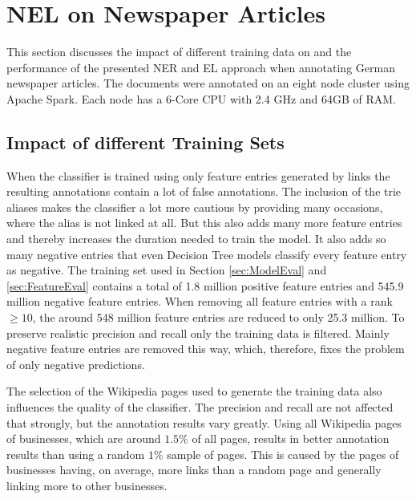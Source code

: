 \section{NEL on Newspaper Articles}
\label{sec:NELEval}
This section discusses the impact of different training data on and the performance of the presented NER and EL approach when annotating German newspaper articles. The documents were annotated on an eight node cluster using Apache Spark. Each node has a 6-Core CPU with 2.4 GHz and 64GB of RAM.\par

\subsection*{Impact of different Training Sets}
When the classifier is trained using only feature entries generated by links the resulting annotations contain a lot of false annotations. The inclusion of the trie aliases makes the classifier a lot more cautious by providing many occasions, where the alias is not linked at all. But this also adds many more feature entries and thereby increases the duration needed to train the model. It also adds so many negative entries that even Decision Tree models classify every feature entry as negative. The training set used in Section \ref{sec:ModelEval} and \ref{sec:FeatureEval} contains a total of 1.8 million positive feature entries and 545.9 million negative feature entries. When removing all feature entries with a rank $\geq 10$, the around 548 million feature entries are reduced to only 25.3 million. To preserve realistic precision and recall only the training data is filtered. Mainly negative feature entries are removed this way, which, therefore, fixes the problem of only negative predictions.\par
The selection of the Wikipedia pages used to generate the training data also influences the quality of the classifier. The precision and recall are not affected that strongly, but the annotation results vary greatly. Using all Wikipedia pages of businesses, which are around $1.5\%$ of all pages, results in better annotation results than using a random $1\%$ sample of pages. This is caused by the pages of businesses having, on average, more links than a random page and generally linking more to other businesses.\par

